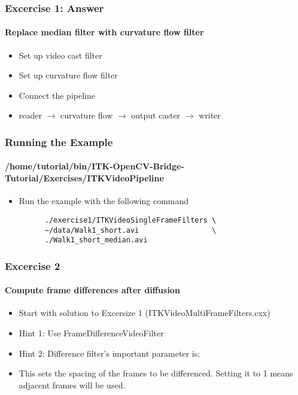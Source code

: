 {
\begin{frame}[fragile]
\frametitle{Excercise 1: Answer}
\framesubtitle{Replace median filter with curvature flow filter}
\begin{itemize}
\item Set up video cast filter
\pause

\item Set up curvature flow filter
\pause

\item Connect the pipeline
\item reader $\rightarrow$ curvature
  flow $\rightarrow$ output caster $\rightarrow$ writer
\end{itemize}
\end{frame}
}

{
\begin{frame}[fragile]
\frametitle{Running the Example}
\framesubtitle{/home/tutorial/bin/ITK-OpenCV-Bridge-Tutorial/Exercises/ITKVideoPipeline}
\begin{itemize}
\item Run the example with the following command
\begin{verbatim}
      ./exercise1/ITKVideoSingleFrameFilters \
      ~/data/Walk1_short.avi                 \
      ./Walk1_short_median.avi 
\end{verbatim}
\end{itemize}
\end{frame}
}


{
\begin{frame}[fragile]
\frametitle{Excercise 2}
\framesubtitle{Compute frame differences after diffusion}
\begin{itemize}
\item Start with solution to Excersize 1 (ITKVideoMultiFrameFilters.cxx)
\pause

\item Hint 1: Use FrameDifferenceVideoFilter
\pause

\item Hint 2: Difference filter's important parameter is:
\item This sets the spacing of the frames to be differenced. Setting
  it to 1 means adjacent frames will be used.
\end{itemize}
\end{frame}
}

